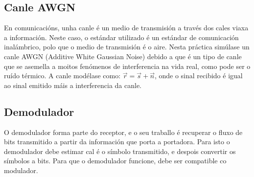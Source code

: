 \documentclass[
	10pt, %
	spanish, %
]{fphw}
\begin{document}
\subsection*{Canle AWGN}
En comunicacións, unha canle é un medio de transmisión a través dos cales viaxa a información. Neste caso, o estándar utilizado é un estándar de comunicación inalámbrico, polo que o medio de transmisión é o aire. Nesta práctica simúlase un canle AWGN (Additive White Gaussian Noise) debido a que é un tipo de canle que se asemella a moitos fenómenos de interferencia na vida real, como pode ser o ruído térmico. A canle modélase como: $\vec{r} = \vec{s} + \vec{n}$, onde o sinal recibido é igual ao sinal emitido máis a interferencia da canle.
\subsection*{Demodulador}
O demodulador forma parte do receptor, e o seu traballo é recuperar o fluxo de bits transmitido a partir da información que porta a portadora. 
Para isto o demodulador debe estimar cal é o símbolo transmitido, e despois convertir os símbolos a bits. Para que o demodulador funcione, debe ser compatible co modulador. 
\end{document}
